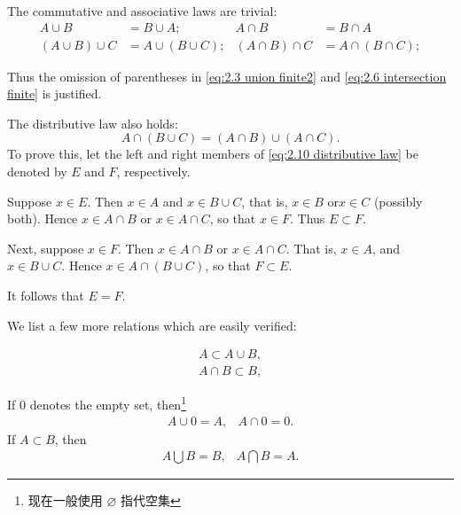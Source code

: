 The commutative and associative laws are trivial:
\begin{align}
        A \cup B &= B \cup A; &
        A \cap B &= B \cap A \label{eq:2.8 commutative} \\
        \left(A \cup B\right) \cup C &= A \cup \left(B \cup C\right); &
        \left(A \cap B\right) \cap C &= A \cap \left(B \cap C\right);\label{eq:2.9 distributive}
\end{align}

Thus the omission of parentheses in \ref{eq:2.3 union finite2} and \ref{eq:2.6 intersection finite} is justified.

The distributive law also holds:
\begin{equation}\label{eq:2.10 distributive law}
    A \cap \left( B \cup C\right) = 
    \left(A \cap B\right) \cup \left(A \cap C\right).
\end{equation}
To prove this, let the left and right members of \ref{eq:2.10 distributive law} be denoted by $E$ and $F$, respectively.

Suppose $x \in E$. Then $x \in A$ and $x \in B \cup C$, that is, $x \in B$ or$ x \in C$ (possibly both). Hence $x \in A\cap B$ or $x \in A\cap C$, so that $x \in F$. Thus $E \subset F$.

Next, suppose $x \in F$. Then $x \in A\cap B$ or $x \in A\cap C$. That is, $x \in A$, and $x \in B\cup C$. Hence $x \in A\cap \left(B \cup C\right)$, so that $F \subset E$.

It follows that $E = F$.

We list a few more relations which are easily verified:

\begin{align}
    A \subset A \cup B, \label{eq:2.11}\\
    A \cap B \subset B, \label{eq:2.12}
\end{align}

If $0$ denotes the empty set, then\footnote{现在一般使用 $\varnothing$ 指代空集}
\begin{equation}
    \begin{array}{cc}
        A \cup 0 = A, & A \cap 0 = 0.
    \end{array}
\end{equation}
If $A \subset B$, then
\begin{equation}
    \begin{array}{cc}
        A \bigcup B = B, & A \bigcap B = A.
    \end{array}
\end{equation}

